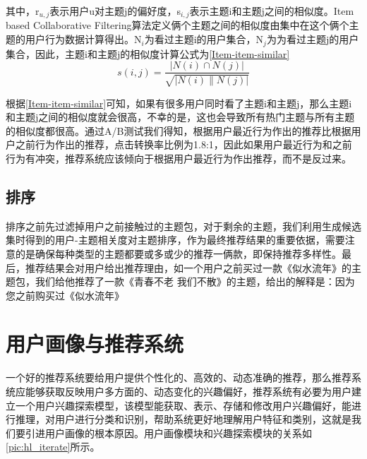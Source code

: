     其中，r$_{u,j}$表示用户u对主题j的偏好度，s$_{i,j}$表示主题i和主题j之间的相似度。Item based Collaborative Filtering算法定义俩个主题之间的相似度由集中在这个俩个主题的用户行为数据计算得出。N$_{i}$为看过主题i的用户集合，N$_{j}$为为看过主题j的用户集合，因此，主题i和主题j的相似度计算公式为\autoref{Item-item-similar}
    \begin{equation}
    s(i,j)=\frac{\left | N(i)\cap N(j) \right |}{\sqrt{\left | N(i) \parallel N(j) \right |}}
    \label{Item-item-similar}
    \end{equation}

    根据\autoref{Item-item-similar}可知，如果有很多用户同时看了主题i和主题j，那么主题i和主题j之间的相似度就会很高，不幸的是，这也会导致所有热门主题与所有主题的相似度都很高。通过A/B测试我们得知，根据用户最近行为作出的推荐比根据用户之前行为作出的推荐，点击转换率比例为1.8:1，因此如果用户最近行为和之前行为有冲突，推荐系统应该倾向于根据用户最近行为作出推荐，而不是反过来。

    \subsection{排序}
    排序之前先过滤掉用户之前接触过的主题包，对于剩余的主题，我们利用生成候选集时得到的用户-主题相关度对主题排序，作为最终推荐结果的重要依据，需要注意的是确保每种类型的主题都要或多或少的推荐一俩款，即保持推荐多样性。最后，推荐结果会对用户给出推荐理由，如一个用户之前买过一款《似水流年》的主题包，我们给他推荐了一款《青春不老 我们不散》的主题，给出的解释是：因为您之前购买过《似水流年》

  \section{用户画像与推荐系统}
  一个好的推荐系统要给用户提供个性化的、高效的、动态准确的推荐，那么推荐系统应能够获取反映用户多方面的、动态变化的兴趣偏好，推荐系统有必要为用户建立一个用户兴趣探索模型，该模型能获取、表示、存储和修改用户兴趣偏好，能进行推理，对用户进行分类和识别，帮助系统更好地理解用户特征和类别，这就是我们要引进用户画像的根本原因。用户画像模块和兴趣探索模块的关系如\autoref{pic:hl_iterate}所示。
  \begin{figure}
    \centering
      \label{pic:hl_iterate}
  \end{figure}

